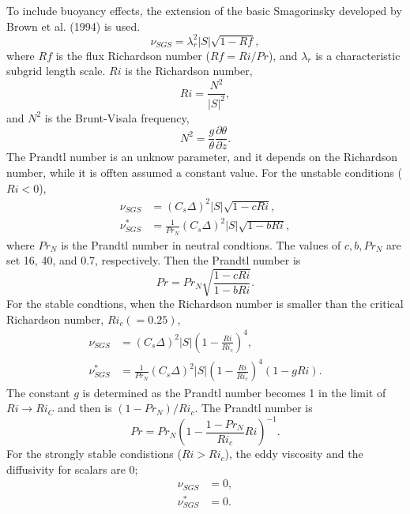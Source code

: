To include buoyancy effects,
the extension of the basic Smagorinsky developed by Brown et al. (1994)
is used.
\begin{equation}
  \nu_{SGS} = \lambda_r^2 |S| \sqrt{1-Rf},
\end{equation}
where $Rf$ is the flux Richardson number ($Rf = Ri/Pr$),
and $\lambda_r$ is a characteristic subgrid length scale.
$Ri$ is the Richardson number,
\begin{equation}
  Ri = \frac{N^2}{|S|^2},
  \label{eq:Ri}
\end{equation}
and $N^2$ is the Brunt-Visala frequency,
\begin{equation}
  N^2 = \frac{g}{\theta}\frac{\partial\theta}{\partial z}.
  \label{eq:N^2}
\end{equation}
The Prandtl number is an unknow parameter,
and it depends on the Richardson number,
while it is offten assumed a constant value.
For the unstable conditions ($Ri < 0$),
\begin{align}
  \nu_{SGS} &= \left(C_s\Delta\right)^2 |S| \sqrt{1 - c Ri}, \label{eq:nu unstable} \\
  \nu^*_{SGS} &= \frac{1}{Pr_N} \left(C_s\Delta\right)^2 |S| \sqrt{1 - b Ri} \label{eq:nu^* unstable},
\end{align}
where $Pr_N$ is the Prandtl number in neutral condtions.
The values of $c, b, Pr_N$ are set 16, 40, and 0.7, respectively.
Then the Prandtl number is
\begin{equation}
  Pr = Pr_N \sqrt{\frac{1-c Ri}{1-b Ri}}.
\end{equation}
For the stable condtions,
when the Richardson number is smaller than the critical Richardson number, $Ri_c (=0.25)$,
\begin{align}
  \nu_{SGS} &= \left(C_s\Delta\right)^2 |S| \left(1-\frac{Ri}{Ri_c}\right)^4, \label{eq:nu stable} \\
  \nu^*_{SGS} &= \frac{1}{Pr_N}\left(C_s\Delta\right)^2 |S| \left(1-\frac{Ri}{Ri_c}\right)^4\left(1-g Ri\right). \label{eq:nu^* stable}
\end{align}
The constant $g$ is determined as the Prandtl number becomes 1
in the limit of $Ri \to Ri_C$ and then is $(1-Pr_N)/Ri_c$.
The Prandtl number is
\begin{equation}
  Pr = Pr_N \left(1-\frac{1-Pr_N}{Ri_c}Ri\right)^{-1}.
\end{equation}
For the strongly stable condistions ($Ri > Ri_c$),
the eddy viscosity and the diffusivity for scalars are 0;
\begin{align}
  \nu_{SGS} &= 0, \label{eq:nu strong stable} \\
  \nu^*_{SGS} &= 0. \label{eq:nu^* strong stable}
\end{align}


